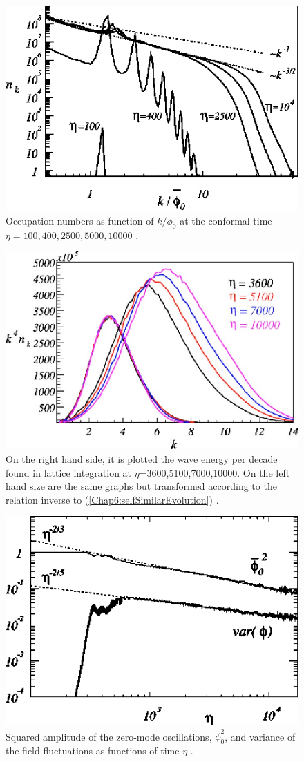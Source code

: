 \documentclass[11pt,a4paper,twoside]{book}
\begin{document}
\begin{figure}
	\centering
	\includegraphics[width=0.55\linewidth, height=0.3\textheight]{Images/Chap6/TurbolentThermalization_fig2}
	\caption{Occupation numbers as function of $ k/\bar{\phi}_{0} $ at the conformal time $ \eta=100, 400, 2500,  5000, 10000 $ \cite{Chap6:TurbolentThermalization}.}
	\label{fig:turbolentThermalizationfig2}
\end{figure}
\begin{figure}
	\centering
	\includegraphics[width=0.6\linewidth, height=0.3\textheight]{Images/Chap6/TurbolentThermalization_fig3}
	\caption{On the right hand side, it is plotted the wave energy per decade found in lattice integration at $\eta$=3600,5100,7000,10000. On the left hand size are the same graphs but transformed according to the relation inverse to (\ref{Chap6:selfSimilarEvolution}) \cite{Chap6:TurbolentThermalization}. }
	\label{fig:turbolentThermalizationfig3}
\end{figure}
\begin{figure}
	\centering
	\includegraphics[width=0.6\linewidth, height=0.3\textheight]{Images/Chap6/TurbolentThermalization_fig1}
	\caption{Squared amplitude of the zero-mode oscillations, $\bar{\phi}_{0}^{2}$, and variance of the field fluctuations as functions of time $\eta$ \cite{Chap6:TurbolentThermalization}.}
	\label{fig:turbolentThermalizationfig1}
\end{figure}
\end{document}
